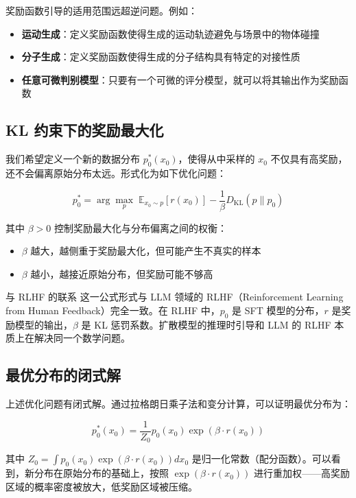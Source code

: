\documentclass[a4paper]{article}
\begin{document}
奖励函数引导的适用范围远超逆问题。例如：

\begin{itemize}
    \item \textbf{运动生成}：定义奖励函数使得生成的运动轨迹避免与场景中的物体碰撞
    \item \textbf{分子生成}：定义奖励函数使得生成的分子结构具有特定的对接性质
    \item \textbf{任意可微判别模型}：只要有一个可微的评分模型，就可以将其输出作为奖励函数
\end{itemize}

\subsection{KL 约束下的奖励最大化}

我们希望定义一个新的数据分布 $p_0^*(x_0)$，使得从中采样的 $x_0$ 不仅具有高奖励，还不会偏离原始分布太远。形式化为如下优化问题：

$$p_0^* = \arg\max_{p} \; \mathbb{E}_{x_0 \sim p}[r(x_0)] - \frac{1}{\beta} D_{\mathrm{KL}}(p \| p_0)$$

其中 $\beta > 0$ 控制奖励最大化与分布偏离之间的权衡：
\begin{itemize}
    \item $\beta$ 越大，越侧重于奖励最大化，但可能产生不真实的样本
    \item $\beta$ 越小，越接近原始分布，但奖励可能不够高
\end{itemize}

\begin{knowledgebox}{与 RLHF 的联系}
这一公式形式与 LLM 领域的 RLHF（Reinforcement Learning from Human Feedback）完全一致。在 RLHF 中，$p_0$ 是 SFT 模型的分布，$r$ 是奖励模型的输出，$\beta$ 是 KL 惩罚系数。扩散模型的推理时引导和 LLM 的 RLHF 本质上在解决同一个数学问题。
\end{knowledgebox}

\subsection{最优分布的闭式解}

上述优化问题有闭式解。通过拉格朗日乘子法和变分计算，可以证明最优分布为：

$$p_0^*(x_0) = \frac{1}{Z_0} p_0(x_0) \exp(\beta \cdot r(x_0))$$

其中 $Z_0 = \int p_0(x_0) \exp(\beta \cdot r(x_0)) dx_0$ 是归一化常数（配分函数）。可以看到，新分布在原始分布的基础上，按照 $\exp(\beta \cdot r(x_0))$ 进行重加权——高奖励区域的概率密度被放大，低奖励区域被压缩。
\end{document}
